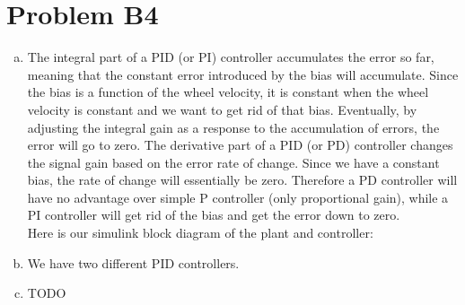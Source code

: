 \documentclass[12pt]{article}
\begin{document}
\section*{Problem B4}
\begin{enumerate}[a)]
	\item The integral part of a PID (or PI) controller accumulates the error so far, meaning that the constant error introduced by the bias will accumulate. Since the bias is a function of the wheel velocity, it is constant when the wheel velocity is constant and we want to get rid of that bias. Eventually, by adjusting the integral gain as a response to the accumulation of errors, the error will go to zero. The derivative part of a PID (or PD) controller changes the signal gain based on the error rate of change. Since we have a constant bias, the rate of change will essentially be zero. Therefore a PD controller will have no advantage over simple P controller (only proportional gain), while a PI controller will get rid of the bias and get the error down to zero.\\
Here is our simulink block diagram of the plant and controller:\\
	\item We have two different PID controllers.

	\item TODO
\end{enumerate}
\end{document}
